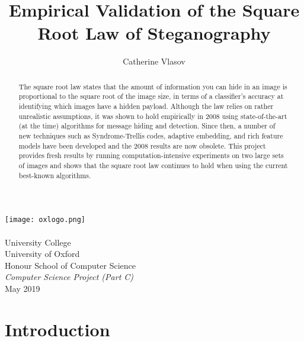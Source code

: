 \documentclass[11pt,a4paper,twoside,openright]{report}
\author{Catherine Vlasov}
\title{Empirical Validation of the Square Root Law of Steganography}
\begin{document}
\makeatletter
  \begin{titlepage}
    \vspace*{\fill}
      \begin{center}
        { \huge \bfseries \@title \par}
        \vspace{20ex}
        \texttt{[image: oxlogo.png]}
        \\[10ex]
        {\LARGE \@author}
        \\[3ex]
        {\Large University College}
        \\[1ex]
        {\Large University of Oxford}
        \\[8ex]
        {\Large Honour School of Computer Science}
        \\[1ex]
        {\Large \emph{Computer Science Project (Part C)}}
        \\[10ex]
        {\LARGE May 2019}
      \end{center}
    \vspace*{\fill}
  \end{titlepage}
\makeatother


\shipout\null


\begin{abstract}

The square root law states that the amount of information you can hide in an image is proportional to the square root of the image size, in terms of a classifier's accuracy at identifying which images have a hidden payload. Although the law relies on rather unrealistic assumptions, it was shown to hold empirically in 2008 using state-of-the-art (at the time) algorithms for message hiding and detection. Since then, a number of new techniques such as Syndrome-Trellis codes, adaptive embedding, and rich feature models have been developed and the 2008 results are now obsolete. This project provides fresh results by running computation-intensive experiments on two large sets of images and shows that the square root law continues to hold when using the current best-known algorithms.

\end{abstract}


\shipout\null
{}

\tableofcontents

\cleardoublepage
{}
\newpage

\chapter{Introduction}
\end{document}
